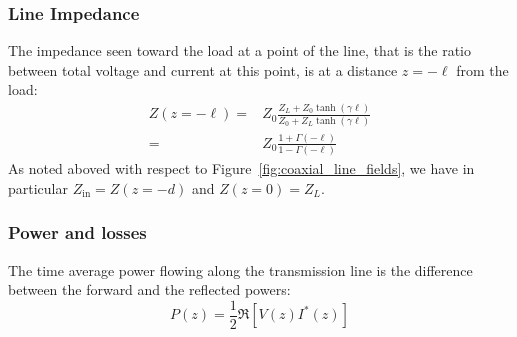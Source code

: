 \subsubsection{Line Impedance}
The impedance seen toward the load at a point of the line, that is the ratio between total voltage and current at this point, is at a distance $z=-\ell$ from the load:
\begin{subequations}
	\begin{align}
Z(z=-\ell) 
	=& Z_0 \frac{Z_L + Z_0 \tanh( \gamma \ell)}{Z_0 + Z_L \tanh(\gamma \ell)} \\
	=& Z_0 \frac{1 + \Gamma(-\ell) }{1 - \Gamma(-\ell) }
	\end{align}
\end{subequations}
As noted aboved with respect to Figure~\ref{fig:coaxial_line_fields}, we have in particular $Z_{\mathrm{in}}=Z(z=-d)$ and $Z(z=0)=Z_L$.

\subsubsection{Power and losses}\label{sec:power_and_losses}
The time average power flowing along the transmission line is the difference between the forward and the reflected powers:
\begin{equation}
P (z) = \frac{1}{2} \Re\left[V(z) I^*(z)\right] 
\label{eq:power_time_average_general}
\end{equation}


